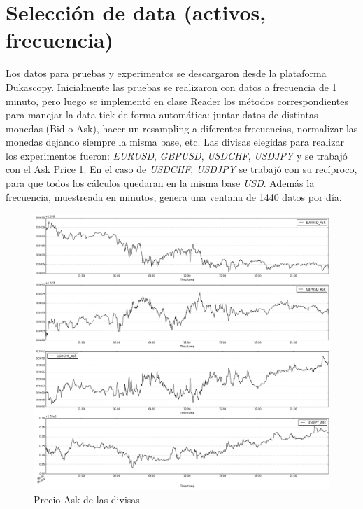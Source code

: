 \section{Selección de data (activos, frecuencia)}

Los datos para pruebas y experimentos se descargaron desde la plataforma
Dukascopy. Inicialmente las pruebas se realizaron con datos a frecuencia de 1
minuto, pero luego se implementó en clase Reader los métodos correspondientes
para manejar la data tick de forma automática: juntar datos de distintas
monedas (Bid o Ask), hacer un resampling a diferentes frecuencias, normalizar
las monedas dejando siempre la misma base, etc. Las divisas elegidas para
realizar los experimentos fueron: \emph{EURUSD}, \emph{GBPUSD}, \emph{USDCHF},
\emph{USDJPY} y se trabajó con el Ask Price \ref{fig:stocks_ask}. En el caso de
\emph{USDCHF}, \emph{USDJPY} se trabajó con su recíproco, para que todos los
cálculos quedaran en la misma base \emph{USD}. Además la frecuencia, muestreada
en minutos, genera una ventana de 1440 datos por día.

\begin{figure}[h!t]
    \begin{center}
        \includegraphics[width=\textwidth]{images/stocks_ask}
        \caption{Precio Ask de las divisas}
        \label{fig:stocks_ask}
    \end{center}
\end{figure}

